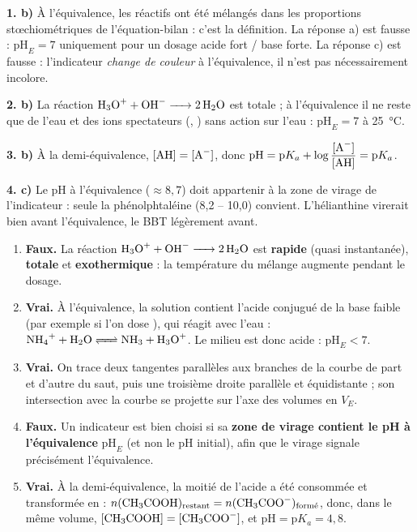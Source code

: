 \documentclass[11pt]{article}
\newcommand{\cle}[1]{{\popxbold\color{popdark}#1}}
\begin{document}
\begin{corrige}
\textbf{1. b)} À l'équivalence, les réactifs ont été mélangés dans les \cle{proportions stœchiométriques} de l'équation-bilan : c'est la définition. La réponse a) est fausse : $\mathrm{pH}_E = 7$ uniquement pour un dosage acide fort / base forte. La réponse c) est fausse : l'indicateur \emph{change de couleur} à l'équivalence, il n'est pas nécessairement incolore.

\textbf{2. b)} La réaction $\ce{H3O+ + OH- -> 2H2O}$ est totale ; à l'équivalence il ne reste que de l'eau et des ions spectateurs (, ) sans action sur l'eau : $\mathrm{pH}_E = 7$ à \SI{25}{\celsius}.

\textbf{3. b)} À la demi-équivalence, $[\ce{AH}] = [\ce{A-}]$, donc $\mathrm{pH} = \mathrm{p}K_a + \log\dfrac{[\ce{A-}]}{[\ce{AH}]} = \mathrm{p}K_a$.

\textbf{4. c)} Le pH à l'équivalence ($\approx 8,7$) doit appartenir à la zone de virage de l'indicateur : seule la phénolphtaléine (8,2 -- 10,0) convient. L'hélianthine virerait bien avant l'équivalence, le BBT légèrement avant.
\end{corrige}

\begin{corrige}
\begin{enumerate}
\item \textbf{Faux.} La réaction $\ce{H3O+ + OH- -> 2H2O}$ est \textbf{rapide} (quasi instantanée), \textbf{totale} et \textbf{exothermique} : la température du mélange augmente pendant le dosage.
\item \textbf{Vrai.} À l'équivalence, la solution contient l'acide conjugué de la base faible (par exemple  si l'on dose ), qui réagit avec l'eau : $\ce{NH4+ + H2O <=> NH3 + H3O+}$. Le milieu est donc acide : $\mathrm{pH}_E < 7$.
\item \textbf{Vrai.} On trace deux tangentes parallèles aux branches de la courbe de part et d'autre du saut, puis une troisième droite parallèle et équidistante ; son intersection avec la courbe se projette sur l'axe des volumes en $V_E$.
\item \textbf{Faux.} Un indicateur est bien choisi si sa \textbf{zone de virage contient le pH à l'équivalence} $\mathrm{pH}_E$ (et non le pH initial), afin que le virage signale précisément l'équivalence.
\item \textbf{Vrai.} À la demi-équivalence, la moitié de l'acide a été consommée et transformée en  : $n(\ce{CH3COOH})_{\text{restant}} = n(\ce{CH3COO-})_{\text{formé}}$, donc, dans le même volume, $[\ce{CH3COOH}] = [\ce{CH3COO-}]$, et $\mathrm{pH} = \mathrm{p}K_a = 4,8$.
\end{enumerate}
\end{corrige}
\end{document}
